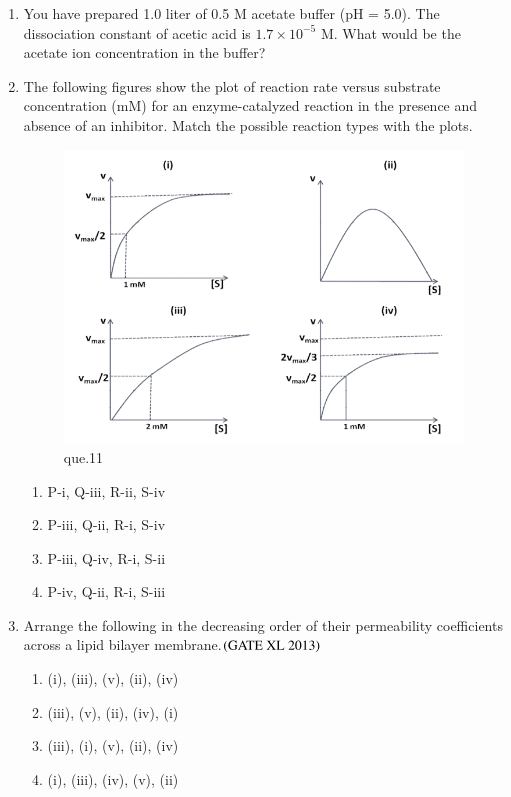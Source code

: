 \documentclass[journal]{IEEEtran}
\begin{document}
\begin{enumerate}
\item You have prepared 1.0 liter of 0.5 M acetate buffer (pH = 5.0). The dissociation constant of acetic acid is $1.7 \times 10^{-5}$ M. What would be the acetate ion concentration in the buffer?\hfill  \textit{}
\begin{enumerate}
\end{enumerate}

\item The following figures show the plot of reaction rate versus substrate concentration (mM) for an enzyme-catalyzed reaction in the presence and absence of an inhibitor. Match the possible reaction types with the plots.\hfill  \textit{}
\begin{figure}
    \centering
    \includegraphics[width=0.5\columnwidth]{figs/Screenshot 2025-08-05 123225.png}
    \caption{que.11}
\end{figure}
\begin{enumerate}
    \item P-i, Q-iii, R-ii, S-iv
    \item P-iii, Q-ii, R-i, S-iv
    \item P-iii, Q-iv, R-i, S-ii
    \item P-iv, Q-ii, R-i, S-iii
\end{enumerate}

\item Arrange the following in the decreasing order of their permeability coefficients across a lipid bilayer membrane.\hfill $\left(\text{GATE XL 2013}\right)$
\begin{enumerate}
    \item (i), (iii), (v), (ii), (iv)
    \item (iii), (v), (ii), (iv), (i)
    \item (iii), (i), (v), (ii), (iv)
    \item (i), (iii), (iv), (v), (ii)
\end{enumerate}


\end{enumerate}
\end{document}
